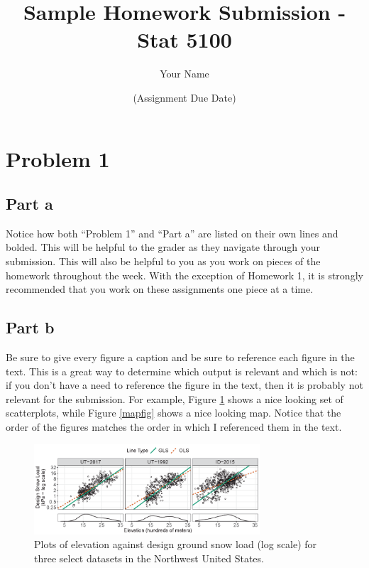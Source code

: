 \documentclass[12pt]{article}
\begin{document}
\title{Sample Homework Submission - Stat 5100}
\author{Your Name}
\date{(Assignment Due Date)}
\maketitle

\section*{Problem 1}
\subsection*{Part a}
Notice how both ``Problem 1'' and ``Part a'' are listed on their own lines and bolded. This will be helpful to the grader as they navigate through your submission. This will also be helpful to you as you work on pieces of the homework throughout the week. With the exception of Homework 1, it is strongly recommended that you work on these assignments one piece at a time.

\subsection*{Part b}
Be sure to give every figure a caption and be sure to reference each figure in the text. This is a great way to determine which output is relevant and which is not: if you don’t have a need to reference the figure in the text, then it is probably not relevant for the submission. For example, Figure \ref{scatterfig} shows a nice looking set of scatterplots, while Figure \ref{mapfig} shows a nice looking map. Notice that the order of the figures matches the order in which I referenced them in the text.

\begin{figure}[H] %
\center %
\includegraphics[width = 0.75\textwidth]{scatter1.png} %
\caption{Plots of elevation against design ground snow load (log scale) for three select datasets in the Northwest United States.}
\label{scatterfig}
\end{figure} 
\end{document}

